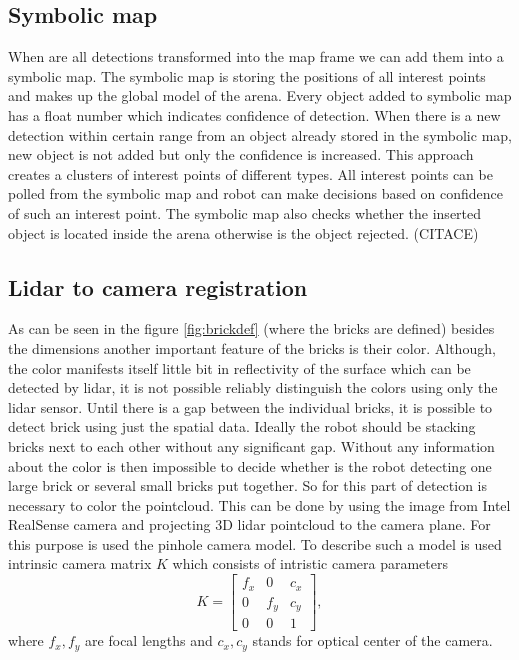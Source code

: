 \subsection{Symbolic map}
When are all detections transformed into the map frame we can add them into a symbolic map. The symbolic map is storing the positions of all interest points and makes up the global model of the arena. Every object added to symbolic map has a float number which indicates confidence of detection. When there is a new detection within certain range from an object already stored in the symbolic map, new object is not added but only the confidence is increased. This approach creates a clusters of interest points of different types. All interest points can be polled from the symbolic map and robot can make decisions based on confidence of such an interest point. The symbolic map also checks whether the inserted object is located inside the arena otherwise is the object rejected. (CITACE)

\subsection{Lidar to camera registration}
As can be seen in the figure \ref{fig:brickdef} (where the bricks are defined) besides the dimensions another important feature of the bricks is their color. Although, the color manifests itself little bit in reflectivity of the surface which can be detected by lidar, it is not possible reliably distinguish the colors using only the lidar sensor. Until there is a gap between the individual bricks, it is possible to detect brick using just the spatial data. Ideally the robot should be stacking bricks next to each other without any significant gap. Without any information about the color is then impossible to decide whether is the robot detecting one large brick or several small bricks put together. So for this part of detection is necessary to color the pointcloud. This can be done by using the image from Intel RealSense camera and projecting 3D lidar pointcloud to the camera plane. For this purpose is used the pinhole camera model. To describe such a model is used intrinsic camera matrix $K$ which consists of intristic camera parameters \cite{hartley2017}
\begin{equation}
K = \begin{bmatrix}
f_x & 0 & c_x \\
0 & f_y & c_y \\
0 & 0 & 1
\end{bmatrix},
\end{equation}
where $f_x, f_y$ are focal lengths and $c_x, c_y$ stands for optical center of the camera.

